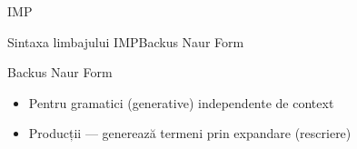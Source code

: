 \documentclass[xcolor=pdftex,romanian,colorlinks]{beamer}
\begin{document}
\begin{section}{IMP}
\begin{frame}{Sintaxa limbajului IMP}{Backus Naur Form}
\end{frame}


 \begin{frame}{Backus Naur Form}
  \begin{itemize}
   \item Pentru gramatici (generative) independente de context
   \item Producții
       --- generează termeni prin expandare (rescriere)


\end{itemize}
\end{frame}
\end{section}
\end{document}
